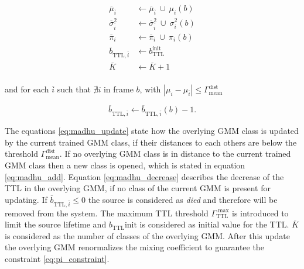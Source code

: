 \begin{equation}
\begin{split}
\overline \mu_{\overline i} &\leftarrow \overline \mu_{\overline i}\ \cup\ \mu_i(b)\\
\overline\sigma^2_{\overline i} &\leftarrow \overline\sigma^2_{\overline i}\ \cup\ \sigma^2_i(b)\\
\overline\pi_i &\leftarrow \overline\pi_i\ \cup\ \pi_i(b)\\
\overline b_{\text{TTL},{\overline i}} &\leftarrow b^\text{init}_\text{TTL}\\
\overline K &\leftarrow \overline K + 1\\
\end{split}
\label{eq:madhu_add}
\end{equation}

and for each $\overline i$ such that $\nexists i$ in frame $b$, with  $|\mu_i-\mu_{\overline i}|\leq\Gamma_\text{mean}^\text{dist}$

\begin{equation}
\overline b_{\text{TTL},{\overline i}} \leftarrow \overline b_{\text{TTL},{\overline i}}(b)-1.
\label{eq:madhu_decrease}
\end{equation}

The equations \ref{eq:madhu_update} state how the overlying \ac{GMM} class is updated by the current trained \ac{GMM} class, if their distances to each others are below the threshold $\Gamma_\text{mean}^\text{dist}$. If no overlying \ac{GMM} class is in distance to the current trained \ac{GMM} class then a new class is opened, which is stated in equation \ref{eq:madhu_add}. Equation \ref{eq:madhu_decrease} describes the decrease of the \ac{TTL} in the overlying \ac{GMM}, if no class of the current \ac{GMM} is present for updating. If $\overline b_{\text{TTL},{\overline i}} \leq 0$ the source is considered as \emph{died} and therefore will be removed from the system. The maximum \ac{TTL} threshold $\Gamma^\text{ max}_\text{TTL}$ is introduced to limit the source lifetime and $b_\text{TTL}\text{init}$ is considered as initial value for the \ac{TTL}. $\overline K$ is considered as the number of classes of the overlying \ac{GMM}. After this update the overlying \ac{GMM} renormalizes the mixing coefficient to guarantee the constraint \ref{eq:pi_constraint}. \cite{madhu2008scalable} \cite[Chapter~4.3]{madhu2010acoustic}


\newpage
\endinput
